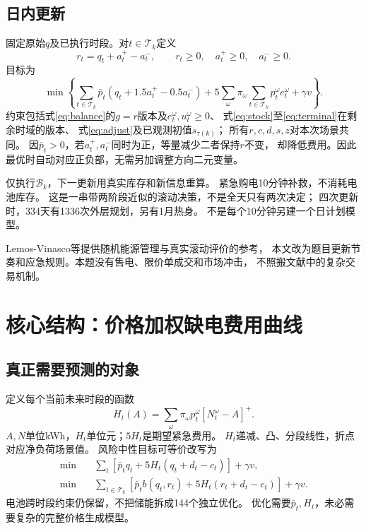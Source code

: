 \documentclass[UTF8,11pt]{ctexart}
\newcommand{\pos}[1]{\left[#1\right]^+}
\begin{document}
\subsection{日内更新}
固定原始$q$及已执行时段。对$t\in\mathcal T_k$定义
\begin{equation}\label{eq:adjust}
 r_t=q_t+a_t^+-a_t^-,\qquad
 r_t\geq0,\quad a_t^+\geq0,\quad a_t^-\geq0.
\end{equation}
目标为
\begin{equation}\label{eq:q43}
 \min\left\{
 \sum_{t\in\mathcal T_k}\bar p_t(q_t+1.5a_t^+-0.5a_t^-)
 +5\sum_\omega\pi_\omega\sum_{t\in\mathcal T_k}p_t^\omega e_t^\omega
 +\gamma v\right\}.
\end{equation}
约束包括式\eqref{eq:balance}的$g=r$版本及$e_t^\omega,u_t^\omega\geq0$、
式\eqref{eq:stock}至\eqref{eq:terminal}在剩余时域的版本、
式\eqref{eq:adjust}及已观测初值$s_{\tau(k)}$；
所有$r,c,d,s,z$对本次场景共同。
因$\bar p_t>0$，若$a_t^+,a_t^-$同时为正，等量减少二者保持$r$不变，
却降低费用。因此最优时自动对应正负部，无需另加调整方向二元变量。

仅执行$\mathcal B_k$，下一更新用真实库存和新信息重算。
紧急购电10分钟补救，不消耗电池库存。
这是一串带两阶段近似的滚动决策，不是全天只有两次决定；
四次更新时，334天有1336次外层规划，另有1月热身。
不是每个10分钟另建一个日计划模型。

Lemos-Vinasco等\cite{lemos2022}提供随机能源管理与真实滚动评价的参考，
本文改为题目更新节奏和应急规则。本题没有售电、限价单成交和市场冲击，
不照搬文献中的复杂交易机制。

\section{核心结构：价格加权缺电费用曲线}
\subsection{真正需要预测的对象}
定义每个当前未来时段的函数
\begin{equation}\label{eq:H}
 H_t(A)=\sum_\omega\pi_\omega p_t^\omega\pos{N_t^\omega-A}.
\end{equation}
$A,N$单位kWh，$H_t$单位元；$5H_t$是期望紧急费用。
$H_t$递减、凸、分段线性，折点对应净负荷场景值。
风险中性目标可等价改写为
\begin{align}
 \min\quad&\sum_t[\bar p_tq_t+5H_t(q_t+d_t-c_t)]+\gamma v,\label{eq:reduce2}\\
 \min\quad&\sum_{t\in\mathcal T_k}
 [\bar p_tb(q_t,r_t)+5H_t(r_t+d_t-c_t)]+\gamma v.\label{eq:reduce3}
\end{align}
电池跨时段约束仍保留，不把储能拆成144个独立优化。
优化需要$\bar p_t,H_t$，未必需要复杂的完整价格生成模型。
\end{document}
